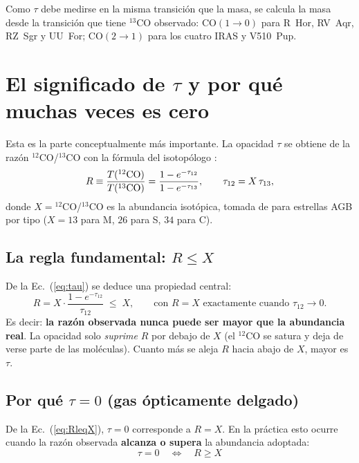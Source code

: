 \documentclass[12pt, a4paper]{article}
\begin{document}
Como $\tau$ debe medirse en la misma transición que la masa, se calcula la masa desde la
transición que tiene $^{13}$CO observado: CO$(1\to0)$ para R~Hor, RV~Aqr, RZ~Sgr y UU~For;
CO$(2\to1)$ para los cuatro IRAS y V510~Pup.

\section{El significado de $\tau$ y por qué muchas veces es cero}

Esta es la parte conceptualmente más importante. La opacidad $\tau$ se obtiene de la razón
$^{12}$CO/$^{13}$CO con la fórmula del isotopólogo \citep{ramstedt2014}:
\begin{equation}
    R \equiv \frac{T(^{12}\rm CO)}{T(^{13}\rm CO)}
    = \frac{1-e^{-\tau_{12}}}{1-e^{-\tau_{13}}},
    \qquad \tau_{12} = X\,\tau_{13},
    \label{eq:tau}
\end{equation}
donde $X = {}^{12}$CO/$^{13}$CO es la abundancia isotópica, tomada de \citet{ramstedt2014}
para estrellas AGB por tipo ($X=13$ para M, $26$ para S, $34$ para C).

\subsection{La regla fundamental: $R \leq X$}

De la Ec.~(\ref{eq:tau}) se deduce una propiedad central:
\begin{equation}
    R = X\cdot\frac{1-e^{-\tau_{12}}}{\tau_{12}} \;\leq\; X,
    \qquad\text{con } R = X \text{ exactamente cuando } \tau_{12}\to0.
    \label{eq:RleqX}
\end{equation}
Es decir: \textbf{la razón observada nunca puede ser mayor que la abundancia real}. La
opacidad solo \emph{suprime} $R$ por debajo de $X$ (el $^{12}$CO se satura y deja de verse
parte de las moléculas). Cuanto más se aleja $R$ hacia abajo de $X$, mayor es $\tau$.

\subsection{Por qué $\tau = 0$ (gas ópticamente delgado)}

De la Ec.~(\ref{eq:RleqX}), $\tau=0$ corresponde a $R = X$. En la práctica esto ocurre
cuando la razón observada \textbf{alcanza o supera} la abundancia adoptada:
\begin{equation}
    \boxed{\;\tau = 0 \quad\Longleftrightarrow\quad R \geq X\;}
\end{equation}
\end{document}
